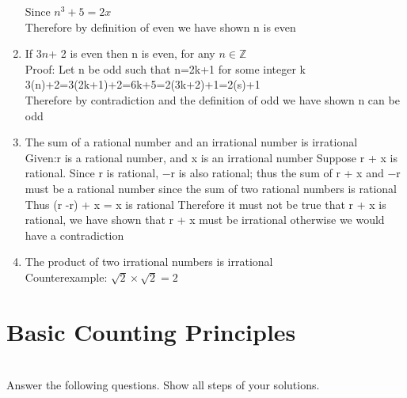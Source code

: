 \documentclass[12pt]{article}
\begin{document}
\begin{enumerate}
Since $n^3 + 5 = 2x $\\
Therefore by definition of even we have shown n is even
\item
If $3n$+ 2 is even then n is even, for any $n \in \mathbb{Z}$\\
Proof: Let n be odd such that n=2k+1 for some integer k\\
3(n)+2=3(2k+1)+2=6k+5=2(3k+2)+1=2(s)+1\\
Therefore by contradiction and the definition of odd we have shown n can be odd
\item
The sum of a rational number and an irrational number is irrational\\
Given:r is a rational number, and x is an irrational number
Suppose r + x is rational.
Since r is rational, −r is also rational; thus the sum of r + x and −r must
be a rational number since the sum of two rational numbers is rational
Thus (r -r) + x = x is rational
Therefore it must not be true that r + x is rational, we have shown that
r + x must be irrational otherwise we would have a contradiction
\item
The product of two irrational numbers is irrational\\
Counterexample: $ \sqrt{2} \times \sqrt{2}=2$

\end{enumerate}

\section*{Basic Counting Principles}\\
Answer the following questions.  Show all steps of your solutions.
\end{document}
